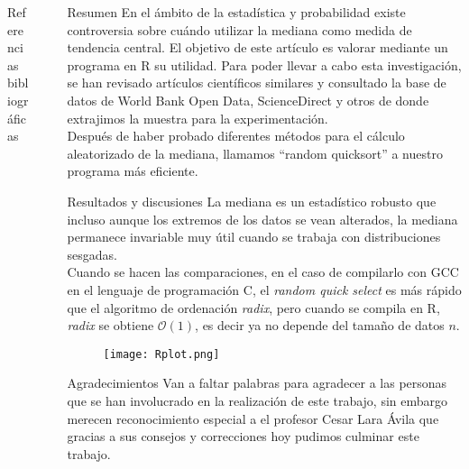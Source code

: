 \documentclass[final]{beamer}
\newlength{\sepwid}
\newlength{\onecolwid}
\begin{document}
\begin{frame}[t]
\begin{columns}[t]
\begin{column}{\onecolwid}
        \begin{block}{Referencias bibliográficas}%
        	\vspace{0.5cm}
        	\nocite{*} %
        	{%
        		}
        \end{block}
         \end{column}

         \begin{column}{\sepwid}  \end{column}
         \begin{column}{\onecolwid} %
         \begin{block}{Resumen}
         	En el ámbito de la estadística y probabilidad existe controversia sobre cuándo utilizar la mediana como medida de tendencia central. El objetivo de este artículo es valorar mediante un programa en R su utilidad. Para poder llevar a cabo esta investigación, se han revisado artículos científicos similares y consultado la base de datos de World Bank Open Data, ScienceDirect y otros de donde extrajimos la muestra para la experimentación.\\[\baselineskip]
         	Después de haber probado diferentes métodos para el cálculo aleatorizado de la mediana, llamamos ``random quicksort'' a nuestro programa más eficiente.
         \end{block}
					\vspace{0.5cm}
       		\begin{block}{Resultados y discusiones}
       		La mediana es un estadístico robusto que incluso aunque los extremos de los datos se vean alterados, la mediana permanece invariable muy útil cuando se trabaja con distribuciones sesgadas.\\[\baselineskip]
       		Cuando se hacen las comparaciones, en el caso de compilarlo con GCC en el lenguaje de programación C, el \emph{random quick select} es más rápido que el algoritmo de ordenación \emph{radix}, pero cuando se compila en R, \emph{radix} se obtiene $\mathcal{O}(1)$, es decir ya no depende del tamaño de datos $n$.
       		\end{block}

					\begin{figure}
					\centering
					\texttt{[image: Rplot.png]}
					\end{figure}
	\begin{block}{\large Agradecimientos}
		Van a faltar palabras para agradecer a las personas que se han involucrado en la realización de este trabajo, sin embargo merecen reconocimiento especial a el profesor Cesar Lara Ávila que gracias a sus consejos y correcciones hoy pudimos culminar este trabajo.
	\end{block}
	\vspace*{-0.9cm}
      \end{column}
      

\end{columns}
\end{frame}
\end{document}
